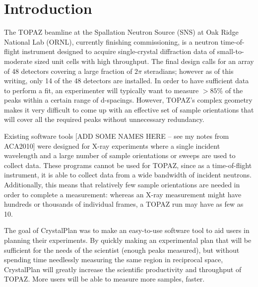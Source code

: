 \documentclass{iucr}              %
\begin{document}
\section{Introduction}

The TOPAZ beamline at the Spallation Neutron Source (SNS) at Oak Ridge National Lab (ORNL),
currently finishing commissioning, is a neutron time-of-flight instrument designed to 
acquire single-crystal diffraction data of small-to-moderate sized unit cells with high throughput. 
The final design calls for an array of 48 detectors covering a large fraction of
$2\pi$ steradians; however as of this writing, only 14 of the 48 detectors are
installed. In order to have sufficient data to perform a fit, an experimenter will
typically want to measure $ > 85\%$ of the peaks within a certain
range of d-spacings. However, TOPAZ's complex geometry makes it very difficult to 
come up with an effective set of sample orientations that will
cover all the required peaks without unnecessary redundancy.


Existing software tools [ADD SOME NAMES HERE – see my notes from ACA2010] 
were designed for X-ray experiments where a single incident
wavelength and a large number of sample orientations or sweeps are used to
collect data. These programs cannot be used for TOPAZ, 
since as a time-of-flight instrument, it is able to collect data
from a wide bandwidth of incident neutrons. 
Additionally, this means that relatively few sample orientations are needed in
order to complete a measurement: whereas an X-ray measurement might have
hundreds or thousands of individual frames, a TOPAZ run may have as few as 10.   


The goal of CrystalPlan was to make an easy-to-use software tool to aid users in
planning their experiments. By quickly making an experimental plan that will be
sufficient for the needs of the scientist (enough peaks measured), but without
spending time needlessly measuring the same region in reciprocal space,
CrystalPlan will greatly increase the scientific productivity and throughput of
TOPAZ. More users will be able to measure more samples, faster. 

\end{document}
